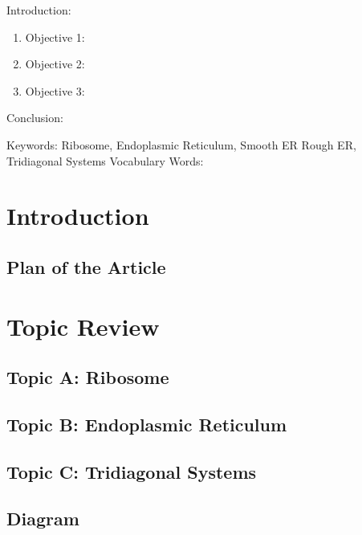 

\twocolumn
\scriptsize
\begin{frontmatter}
		\title{}
		\author{}
		\address{The Mathematical Learning Space}
\end{frontmatter}	

Introduction:
\begin{enumerate}
\item Objective 1:
\item Objective 2:
\item Objective 3:
\end{enumerate}
Conclusion:

Keywords: Ribosome, Endoplasmic Reticulum, Smooth ER Rough ER, Tridiagonal Systems
Vocabulary Words:

\section{Introduction}

\subsection{Plan of the Article}


\section{Topic Review}

\subsection{Topic A: Ribosome}

\subsection{Topic B: Endoplasmic Reticulum}

\subsection{Topic C: Tridiagonal Systems}

\subsection{Diagram}

